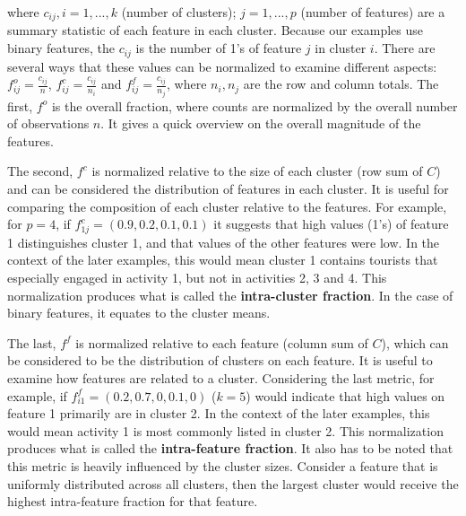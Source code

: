 \documentclass[article]{ajs}
\begin{document}
where $c_{ij}, i=1, ..., k$ (number of clusters); $j=1, ..., p$ (number of features) are a summary statistic of each feature in each cluster. Because our examples use binary features, the $c_{ij}$ is the number of 1's of feature $j$ in cluster $i$. %
There are several ways that these values can be normalized to examine different aspects: $f_{ij}^{o} = \frac{c_{ij}}{n}$, $f_{ij}^{c} = \frac{c_{ij}}{n_{i}}$ and $f_{ij}^{f} = \frac{c_{ij}}{n_{j}}$, where $n_i, n_j$ are the row and column totals. The first, $f^{o}$ is the overall fraction, where counts are normalized by the overall number of observations $n$. It gives a quick overview on the overall magnitude of the features.

The second, $f^c$ is normalized relative to the size of each cluster (row sum of $C$) and can be considered the distribution of features in each cluster. It is useful for comparing the composition of each cluster relative to the features. For example, for $p=4$, if $f^c_{1j} = (0.9, 0.2, 0.1, 0.1)$ it suggests that high values (1's) of feature 1 distinguishes cluster 1, and that values of the other features were low. In the context of the later examples, this would mean cluster 1 contains tourists that especially engaged in activity 1, but not in activities 2, 3 and 4. This normalization produces what is called the {\bf intra-cluster fraction}. In the case of binary features, it equates to the cluster means.

The last, $f^f$ is normalized relative to each feature (column sum of $C$), which can be considered to be the distribution of clusters on each feature. It is useful to examine how features are related to a cluster. Considering the last metric, for example, if $f^f_{i1} = (0.2, 0.7, 0, 0.1, 0)$ ($k=5$) would indicate that high values on feature 1 primarily are in cluster 2. In the context of the later examples, this would mean activity 1 is most commonly listed in cluster 2. This normalization produces what is called the {\bf intra-feature fraction}. It also has to be noted that this metric is heavily influenced by the cluster sizes. Consider a feature that is uniformly distributed across all clusters, then the largest cluster would receive the highest intra-feature fraction for that feature.
\end{document}
